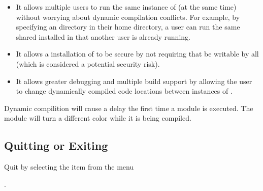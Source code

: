 \begin{itemize}
\item It allows multiple users to run the same instance of \sr{} (at
the same time) without worrying about dynamic compilation conflicts.
For example, by specifying an 
directory in their home directory, a user can run the same shared
\sr{} installed in  that another user
is already running.

\item It allows a  installation of \sr{}
to be secure by not requiring that
 be writable by
all (which is considered a potential security risk).

\item It allows greater debugging and multiple build support by
allowing the user to change dynamically compiled code locations
between instances of \sr{}.

\end{itemize}

Dynamic compilition will cause a delay the first time a module is
executed.  The module will turn a different color while it is being
compiled.

\subsection{Quitting or Exiting \sr{}}
\label{sec:stopping}

Quit \sr{} by selecting the  item from the  menu

.


